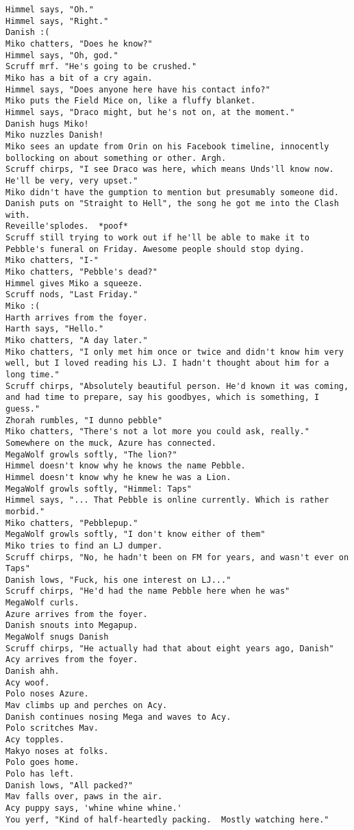 \begin{verbatim}
Himmel says, "Oh."
Himmel says, "Right."
Danish :(
Miko chatters, "Does he know?"
Himmel says, "Oh, god."
Scruff mrf. "He's going to be crushed."
Miko has a bit of a cry again.
Himmel says, "Does anyone here have his contact info?"
Miko puts the Field Mice on, like a fluffy blanket.
Himmel says, "Draco might, but he's not on, at the moment."
Danish hugs Miko!
Miko nuzzles Danish!
Miko sees an update from Orin on his Facebook timeline, innocently bollocking on about something or other. Argh.
Scruff chirps, "I see Draco was here, which means Unds'll know now. He'll be very, very upset."
Miko didn't have the gumption to mention but presumably someone did.
Danish puts on "Straight to Hell", the song he got me into the Clash with.
Reveille'splodes.  *poof*
Scruff still trying to work out if he'll be able to make it to Pebble's funeral on Friday. Awesome people should stop dying.
Miko chatters, "I-"
Miko chatters, "Pebble's dead?"
Himmel gives Miko a squeeze.
Scruff nods, "Last Friday."
Miko :(
Harth arrives from the foyer.
Harth says, "Hello."
Miko chatters, "A day later."
Miko chatters, "I only met him once or twice and didn't know him very well, but I loved reading his LJ. I hadn't thought about him for a long time."
Scruff chirps, "Absolutely beautiful person. He'd known it was coming, and had time to prepare, say his goodbyes, which is something, I guess."
Zhorah rumbles, "I dunno pebble"
Miko chatters, "There's not a lot more you could ask, really."
Somewhere on the muck, Azure has connected.
MegaWolf growls softly, "The lion?"
Himmel doesn't know why he knows the name Pebble.
Himmel doesn't know why he knew he was a Lion.
MegaWolf growls softly, "Himmel: Taps"
Himmel says, "... That Pebble is online currently. Which is rather morbid."
Miko chatters, "Pebblepup."
MegaWolf growls softly, "I don't know either of them"
Miko tries to find an LJ dumper.
Scruff chirps, "No, he hadn't been on FM for years, and wasn't ever on Taps"
Danish lows, "Fuck, his one interest on LJ..."
Scruff chirps, "He'd had the name Pebble here when he was"
MegaWolf curls.
Azure arrives from the foyer.
Danish snouts into Megapup.
MegaWolf snugs Danish
Scruff chirps, "He actually had that about eight years ago, Danish"
Acy arrives from the foyer.
Danish ahh.
Acy woof.
Polo noses Azure.
Mav climbs up and perches on Acy.
Danish continues nosing Mega and waves to Acy.
Polo scritches Mav.
Acy topples.
Makyo noses at folks.
Polo goes home.
Polo has left.
Danish lows, "All packed?"
Mav falls over, paws in the air.
Acy puppy says, 'whine whine whine.'
You yerf, "Kind of half-heartedly packing.  Mostly watching here."

\end{verbatim}
